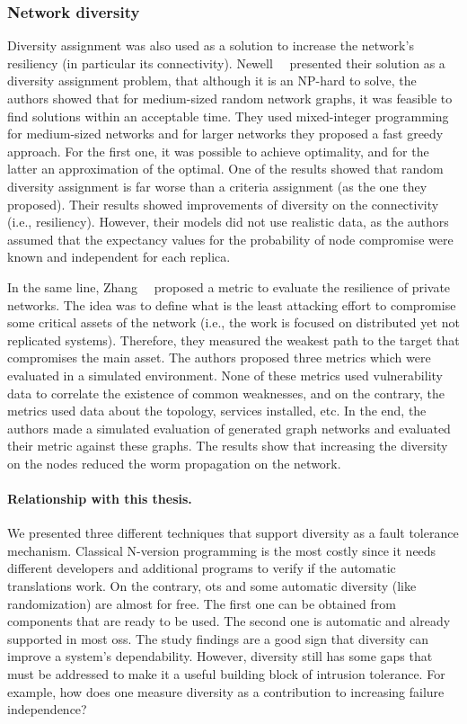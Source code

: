 \subsubsection{Network diversity}

Diversity assignment was also used as a solution to increase the network's resiliency (in particular its connectivity).
Newell~\etal{}~\cite{Newell:2015} presented their solution as a diversity assignment problem, that although it is an NP-hard to solve, the authors showed that for medium-sized random network graphs, it was feasible to find solutions within an acceptable time.
They used mixed-integer programming for medium-sized networks and for larger networks they proposed a fast greedy approach.
For the first one, it was possible to achieve optimality, and for the latter an approximation of the optimal.
One of the results showed that random diversity assignment is far worse than a criteria assignment (as the one they proposed).
Their results showed improvements of diversity on the connectivity (i.e., resiliency).
However, their models did not use realistic data, as the authors assumed that the expectancy values for the probability of node compromise were known and independent for each replica.


In the same line, Zhang~\etal{}~\cite{Zhang:2016} proposed a metric to evaluate the resilience of private networks.
The idea was to define what is the least attacking effort to compromise some critical assets of the network (i.e., the work is focused on distributed yet not replicated systems).
Therefore, they measured the weakest path to the target that compromises the main asset. 
The authors proposed three metrics which were evaluated in a simulated environment.
None of these metrics used vulnerability data to correlate the existence of common weaknesses, and on the contrary, the metrics used data about the topology, services installed, etc.
In the end, the authors made a simulated evaluation of generated graph networks and evaluated their metric against these graphs. 
The results show that increasing the diversity on the nodes reduced the worm propagation on the network.
 

\paragraph{Relationship with this thesis.}
We presented three different techniques that support diversity as a fault tolerance mechanism. 
Classical N-version programming is the most costly since it needs different developers and additional programs to verify if the automatic translations work. 
On the contrary, \gls{ots} and some automatic diversity (like randomization) are almost for free. 
The first one can be obtained from components that are ready to be used. 
The second one is automatic and already supported in most \glspl{os}. 
The study findings are a good sign that diversity can improve a system’s dependability.
However, diversity still has some gaps that must be addressed to make it a useful building block of intrusion tolerance. 
For example, how does one measure diversity as a contribution to increasing failure independence?


